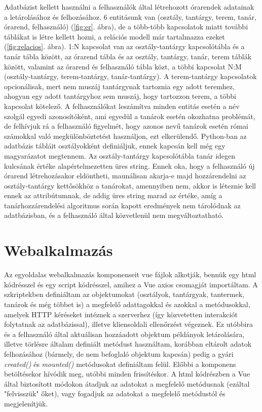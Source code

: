 Adatbázist kellett használni a felhasználók által létrehozott órarendek adatainak a letárolásához és felhozásához. 6 entitásunk van (osztály, tantárgy, terem, tanár, órarend, felhasználó) (\ref{fig:er}. ábra), de a több-több kapcsolatok miatt további táblákat is létre kellett hozni, a relációs modell már tartalmazza ezeket (\ref{fig:relacios}. ábra). 1:N kapcsolat van az osztály-tantárgy kapcsolótábla és a tanár tábla között, az órarend tábla és az osztály, tantárgy, tanár, terem táblák között, valamint az órarend és felhasználó tábla közt, a többi kapcsolat N:M (osztály-tantárgy, terem-tantárgy, tanár-tantárgy). A terem-tantárgy kapcsolatok opcionálisak, mert nem muszáj tantárgynak tartoznia egy adott teremhez, ahogyan egy adott tantárgyhoz sem muszáj, hogy tartozzon terem, a többi kapcsolat kötelező. A felhasználókat leszámítva minden entitás esetén a név szolgál egyedi azonosítóként, ami egyedül a tanárok esetén okozhatna problémát, de felhívjuk rá a felhasználó figyelmét, hogy azonos nevű tanárok esetén római számokkal való megkülönböztetést használjon, ezt elkerülendő. Python-ban az adatbázis tábláit osztályokként definiáljuk, ennek kapcsán kell még egy magyarázatot megtennem. Az osztály-tantárgy kapcsolótábla tanár idegen kulcsának értéke alapértelmezetten üres string. Ennek oka, hogy a felhasználó új órarend létrehozásakor eldöntheti, maunálisan akarja-e majd hozzárendelni az osztály-tantárgy kettősökhöz a tanárokat, amennyiben nem, akkor is léteznie kell ennek az attribútumnak, de addig üres string marad az értéke, amíg a tanárhozzárendelési algoritmus során kapott eredmények nem tárolódnak az adatbázisban, és a felhasználó által közvetlenül nem megváltoztatható.

\section{Webalkalmazás}

Az egyoldalas webalkalmazás komponenseit vue fájlok alkotják, bennük egy html kódrésszel és egy script kódrésszel, amihez a Vue axios csomagját importáltam. A szkriptekben definiáltam az objektumokat (osztályok, tantárgyak, tantermek, tanárok és még többet is) a megfelelő adattagokkal és azokkal a metódusokkal, amelyek HTTP kéréseket intéznek a szerverhez (így közvetetten interakciót folytatnak az adatbázissal), illetve kliensoldali ellenőrzést végeznek. Ez utóbbira és a felhasználó által aktuálisan hozzáadott objektum példányok letárolására, illetve törlésre általam definiált metódust használtam, korábban eltárolt adatok felhozásához (bármely, de nem befoglaló objektum kapcsán) pedig a gyári \textit{created()} és \textit{mounted()} metódusokat definiáltam felül. Előbbi a komponens betöltésekor hívódik meg, utóbbi minden frissítéskor. A html kódrészben a Vue által biztosított módokon átadjuk az adatokat a megfelelő metódusnak (ezáltal "felvisszük" őket), vagy fogadjuk az adatokat a megfelelő metódustól és megjelenítjük.

